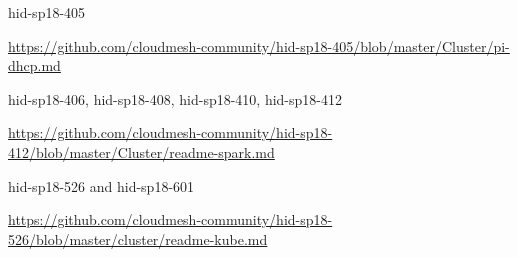 \begin{IU}

hid-sp18-405 

\url{https://github.com/cloudmesh-community/hid-sp18-405/blob/master/Cluster/pi-dhcp.md}

\end{IU}




\begin{IU}

hid-sp18-406,  hid-sp18-408, hid-sp18-410, hid-sp18-412

\url{https://github.com/cloudmesh-community/hid-sp18-412/blob/master/Cluster/readme-spark.md }
 
\end{IU}




\begin{IU}

hid-sp18-526 and hid-sp18-601

\url{https://github.com/cloudmesh-community/hid-sp18-526/blob/master/cluster/readme-kube.md}

\end{IU}



